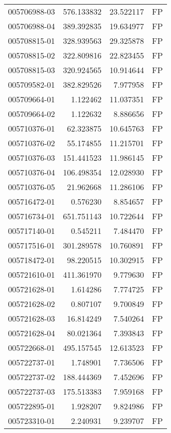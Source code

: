 \begin{tabular}{lrrl}
005706988-03 &  576.133832 &    23.522117 &   FP \\
005706988-04 &  389.392835 &    19.634977 &   FP \\
005708815-01 &  328.939563 &    29.325878 &   FP \\
005708815-02 &  322.809816 &    22.823455 &   FP \\
005708815-03 &  320.924565 &    10.914644 &   FP \\
005709582-01 &  382.829526 &     7.977958 &   FP \\
005709664-01 &    1.122462 &    11.037351 &   FP \\
005709664-02 &    1.122632 &     8.886656 &   FP \\
005710376-01 &   62.323875 &    10.645763 &   FP \\
005710376-02 &   55.174855 &    11.215701 &   FP \\
005710376-03 &  151.441523 &    11.986145 &   FP \\
005710376-04 &  106.498354 &    12.028930 &   FP \\
005710376-05 &   21.962668 &    11.286106 &   FP \\
005716472-01 &    0.576230 &     8.854657 &   FP \\
005716734-01 &  651.751143 &    10.722644 &   FP \\
005717140-01 &    0.545211 &     7.484470 &   FP \\
005717516-01 &  301.289578 &    10.760891 &   FP \\
005718472-01 &   98.220515 &    10.302915 &   FP \\
005721610-01 &  411.361970 &     9.779630 &   FP \\
005721628-01 &    1.614286 &     7.774725 &   FP \\
005721628-02 &    0.807107 &     9.700849 &   FP \\
005721628-03 &   16.814249 &     7.540264 &   FP \\
005721628-04 &   80.021364 &     7.393843 &   FP \\
005722668-01 &  495.157545 &    12.613523 &   FP \\
005722737-01 &    1.748901 &     7.736506 &   FP \\
005722737-02 &  188.444369 &     7.452696 &   FP \\
005722737-03 &  175.513383 &     7.959168 &   FP \\
005722895-01 &    1.928207 &     9.824986 &   FP \\
005723310-01 &    2.240931 &     9.239707 &   FP \\

\end{tabular}
